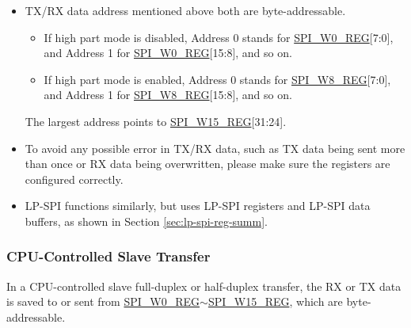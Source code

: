 \documentclass[main\_\_EN.tex]{subfiles}
\begin{document}
\begin{tiplisting}
\vspace{-2em}
\begin{itemize}
    \item TX/RX data address mentioned above both are byte-addressable.
    \begin{itemize}
        \item If high part mode is disabled, Address 0 stands for \hyperref[regdesc:SPIW0REG]{SPI\_W0\_REG}[7:0], and Address 1 for \hyperref[regdesc:SPIW0REG]{SPI\_W0\_REG}[15:8], and so on.
        \item If high part mode is enabled, Address 0 stands for \hyperref[regdesc:SPIW0REG]{SPI\_W8\_REG}[7:0], and Address 1 for \hyperref[regdesc:SPIW0REG]{SPI\_W8\_REG}[15:8], and so on.
    \end{itemize}
    The largest address points to \hyperref[regdesc:SPIW0REG]{SPI\_W15\_REG}[31:24].
    \item To avoid any possible error in TX/RX data, such as TX data being sent more than once or RX data being overwritten, please make sure the registers are configured correctly.
    \item LP-SPI functions similarly, but uses LP-SPI registers and LP-SPI data buffers, as shown in Section \ref{sec:lp-spi-reg-summ}.
\end{itemize}
\end{tiplisting}

\subsubsection{CPU-Controlled Slave Transfer} \label{GP-SPI slave CPU}

In a CPU-controlled slave full-duplex or half-duplex transfer, the RX or TX data is saved to or sent from \hyperref[regdesc:SPIW0REG]{SPI\_W0\_REG}$\sim$\hyperref[regdesc:SPIW15REG]{SPI\_W15\_REG}, which are byte-addressable.
\end{document}
